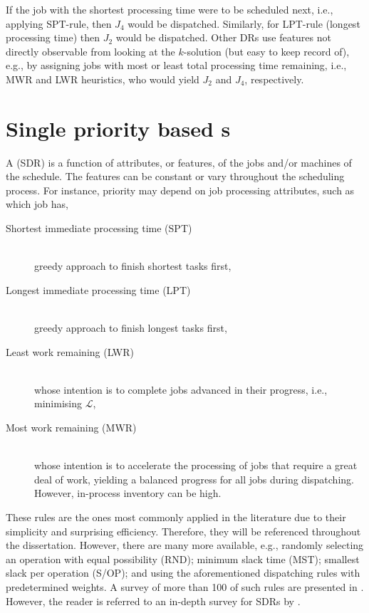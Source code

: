 If the job with the shortest processing time were to be scheduled next, i.e., 
applying SPT-rule, then $J_4$ would be dispatched. Similarly, for  LPT-rule 
(longest processing time) then $J_2$ would be dispatched. 
Other DRs use features not directly observable from looking at the $k$-solution 
(but easy to keep record of), e.g., by assigning jobs 
with most or least total processing time remaining, i.e., MWR and LWR 
heuristics, who would yield $J_2$ and $J_4$, respectively.

\section{Single priority based \dr s}\label{sec:SDR}

A \emph{\sdr} (SDR) is a function of attributes, or features, of the jobs 
and/or machines of the schedule. The features can be constant or vary 
throughout the scheduling process. 
For instance, priority may depend on job processing attributes, such as 
which job has, 
\begin{description}
    \item[Shortest immediate processing time (SPT)] \hfill \\
    greedy approach to finish shortest tasks first,  
    \item[Longest immediate processing time (LPT)] \hfill \\
    greedy approach to finish longest tasks first, 
    \item[Least work remaining (LWR)] \hfill \\
    whose intention is to complete jobs advanced in their pro\-gress, i.e., 
    minimising $\mathcal{L}$,
    \item[Most work remaining (MWR)] \hfill \\
    whose intention is to accelerate the processing of jobs that require a 
    great deal of work, yielding a balanced progress for all jobs during 
    dispatching. However, in-process inventory can be high.
\end{description}
These rules are the ones most commonly applied in the literature due to their 
simplicity and surprising efficiency. %
Therefore, they will be referenced throughout the dissertation. 
However, there are many more available, e.g., randomly selecting an operation 
with equal possibility (RND); minimum slack time (MST); smallest slack per 
operation (S/OP); and using the aforementioned dispatching rules with 
predetermined weights. 
A survey of more than 100 of such rules are presented in \citet{Panwalkar77}. 
However, the reader is referred to an in-depth survey for SDRs by 
\citet{Haupt89}. 


